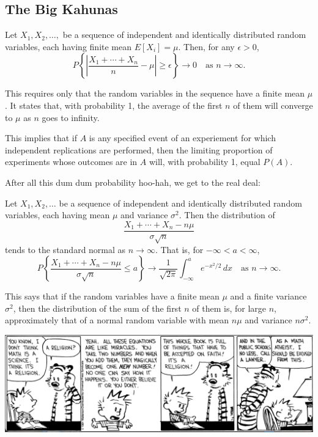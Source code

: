 \documentclass{article}
\begin{document}
\subsection{The Big Kahunas}
\begin{theorem}
    Let $X_{1},X_{2},\dotsc,$ be a sequence of independent and identically distributed random variables, each having finite mean $E[X_{i}]=\mu$. Then, for any $\epsilon>0$,
    \[P\left\{\left|\frac{X_{1}+\dotsi+X_{n}}{n}-\mu\right|\geq \epsilon\right\}\rightarrow 0\quad\textrm{as }n\rightarrow\infty.\]
\end{theorem}
\begin{remark}
    This requires only that the random variables in the sequence have a finite mean $\mu$. It states that, with probability 1, the average of the first $n$ of them will converge to $\mu$ as $n$ goes to infinity. 

    This implies that if $A$ is any specified event of an experiement for which independent replications are performed, then the limiting proportion of experiments whose outcomes are in $A$ will, with probability 1, equal $P(A)$.
\end{remark}
After all this dum dum probability hoo-hah, we get to the real deal:
\begin{theorem}
    Let $X_{1},X_{2},\dotsc$ be a sequence of independent and identically distributed random variables, each having mean $\mu$ and variance $\sigma^{2}$. Then the distribution of 
    \[\frac{X_{1}+\dotsi+X_{n}-n\mu}{\sigma\sqrt{n}}\]tends to the standard normal as $n\rightarrow\infty$. That is, for $-\infty<a<\infty$,
    \[P\left\{\frac{X_{1}+\dotsi+X_{n}-n\mu}{\sigma\sqrt{n}}\leq a\right\}\rightarrow \frac{1}{\sqrt{2\pi}}\int_{-\infty}^{a}e^{-x^{2}/2}\,dx\quad\textrm{as }n\rightarrow\infty.\]
\end{theorem}
\begin{remark}
    This says that if the random variables have a finite mean $\mu$ and a finite variance $\sigma^{2}$, then the distribution of the sum of the first $n$ of them is, for large $n$, approximately that of a normal random variable with mean $n\mu$ and variance $n\sigma^{2}$.
\end{remark}




    
\newpage
\begin{center}
    \includegraphics[scale=0.5]{Screenshot 2022-12-06 at 5.05.50 PM.png}\\[2cm]
\end{center}
\end{document}
